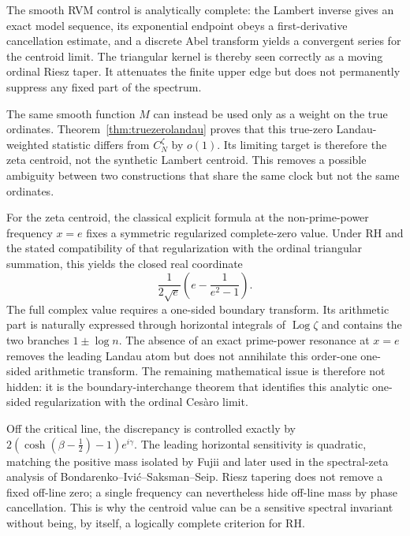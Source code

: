 \documentclass[11pt]{amsart}
\numberwithin{equation}{section}
\theoremstyle{definition}
\theoremstyle{remark}
\newcommand{\Log}{\operatorname{Log}}
\begin{document}
The smooth RVM control is analytically complete: the Lambert inverse gives an exact model sequence, its exponential endpoint obeys a first-derivative cancellation estimate, and a discrete Abel transform yields a convergent series for the centroid limit.  The triangular kernel is thereby seen correctly as a moving ordinal Riesz taper.  It attenuates the finite upper edge but does not permanently suppress any fixed part of the spectrum.

The same smooth function $M$ can instead be used only as a weight on the true ordinates.  Theorem~\ref{thm:truezerolandau} proves that this true-zero Landau-weighted statistic differs from $C_N^{\zeta}$ by $o(1)$.  Its limiting target is therefore the zeta centroid, not the synthetic Lambert centroid.  This removes a possible ambiguity between two constructions that share the same clock but not the same ordinates.

For the zeta centroid, the classical explicit formula at the non-prime-power frequency $x=e$ fixes a symmetric regularized complete-zero value.  Under RH and the stated compatibility of that regularization with the ordinal triangular summation, this yields the closed real coordinate
\[
\frac{1}{2\sqrt e}\left(e-\frac1{e^2-1}\right).
\]
The full complex value requires a one-sided boundary transform.  Its arithmetic part is naturally expressed through horizontal integrals of $\Log\zeta$ and contains the two branches $1\pm\log n$.  The absence of an exact prime-power resonance at $x=e$ removes the leading Landau atom but does not annihilate this order-one one-sided arithmetic transform.  The remaining mathematical issue is therefore not hidden: it is the boundary-interchange theorem that identifies this analytic one-sided regularization with the ordinal Cesàro limit.

Off the critical line, the discrepancy is controlled exactly by $2(\cosh(\beta-\tfrac12)-1)e^{i\gamma}$.  The leading horizontal sensitivity is quadratic, matching the positive mass isolated by Fujii and later used in the spectral-zeta analysis of Bondarenko--Ivić--Saksman--Seip.  Riesz tapering does not remove a fixed off-line zero; a single frequency can nevertheless hide off-line mass by phase cancellation.  This is why the centroid value can be a sensitive spectral invariant without being, by itself, a logically complete criterion for RH.

\appendix
\end{document}

